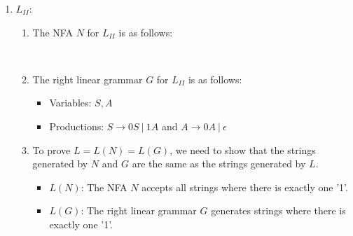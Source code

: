 \documentclass[a4paper]{article}
\begin{document}
\begin{enumerate}
\begin{enumerate}[label=\arabic*)]
            \item $L_{II}$:\\
            \begin{enumerate}[label=(\alph*)]
                \item The NFA $N$ for $L_{II}$ is as follows: \\
                 \\

                \item The right linear grammar $G$ for $L_{II}$ is as follows: \\
                \begin{itemize}
                    \item Variables: $S, A$
                    \item Productions: $S \rightarrow 0S \ | \ 1A$ and $A \rightarrow 0A \ | \ \epsilon$
                \end{itemize}

                \item To prove $L = L(N) = L(G)$, we need to show that the strings generated by $N$ and $G$ are the same as the strings generated by $L$. \\
                \begin{itemize}
                    \item $L(N)$: The NFA $N$ accepts all strings where there is exactly one '1'.
                    \item $L(G)$: The right linear grammar $G$ generates strings where there is exactly one '1'. \\ \\
                \end{itemize}
            \end{enumerate}


\end{enumerate}
\end{enumerate}
\end{document}
